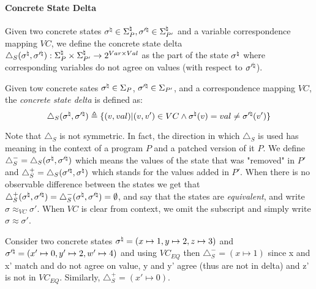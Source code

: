 \paragraph{Concrete State Delta} 
Given two concrete states $\sigma^\natural \in \Sigma_{P}^\natural,\sigma'^\natural \in \Sigma_{P'}^\natural$ and a variable correspondence mapping $VC$, we define the concrete state delta $\triangle_{S}(\sigma^\natural,\sigma'^\natural) : \Sigma^\natural_{P} \times \Sigma^\natural_{P'} \rightarrow 2^{Var \times Val}$ as the part of the state $\sigma^\natural$ where corresponding variables do not agree on values (with respect to $\sigma'^\natural$). 

\begin{definition}
Given tow concrete sates $\sigma^\natural \in \Sigma_{P}$, $\sigma'^\natural \in \Sigma_{P'}$, and a correspondence mapping $VC$, the \emph{concrete state delta} is defined as:
\[
\triangle_{S}(\sigma^\natural,\sigma'^\natural) \triangleq \{ (v,val) | (v,v') \in VC \wedge \sigma^\natural(v) = val \neq \sigma'^\natural(v')\}
\]
\end{definition}
Note that $\triangle_{S}$ is not symmetric. In fact, the direction in which $\triangle_{S}$ is used has meaning in the context of a program $P$ and a patched version of it $P$. We define $\triangle_{S}^{-} = \triangle_{S}(\sigma^\natural,\sigma'^\natural)$ which means the values of the state that was "removed" in $P'$ and $\triangle_{S}^{+} = \triangle_{S}(\sigma'^\natural,\sigma^\natural)$ which stands for the values added in $P'$. When there is no observable difference between the states we get that $\triangle_{S}^{+}(\sigma^\natural,\sigma'^\natural)= \triangle_{S}^{-}(\sigma^\natural,\sigma'^\natural) = \emptyset$, and say that the states are \emph{equivalent}, and write $\sigma \approx_{VC} \sigma'$. When $VC$ is clear from context, we omit the subscript and simply write $\sigma \approx \sigma'$.

\begin{Example}
Consider two concrete states $\sigma^\natural = (x \mapsto 1,y \mapsto 2,z \mapsto 3)$ and $\sigma'^\natural = (x' \mapsto 0,y' \mapsto 2,w' \mapsto 4)$ and using $VC_{EQ}$ then $\triangle_{S}^{-} = (x \mapsto 1)$ since x and x' match and do not agree on value, y and y' agree (thus are not in delta) and z' is not in $VC_{EQ}$. Similarly, $\triangle_{S}^{+} = (x' \mapsto 0)$. %
\end{Example}

